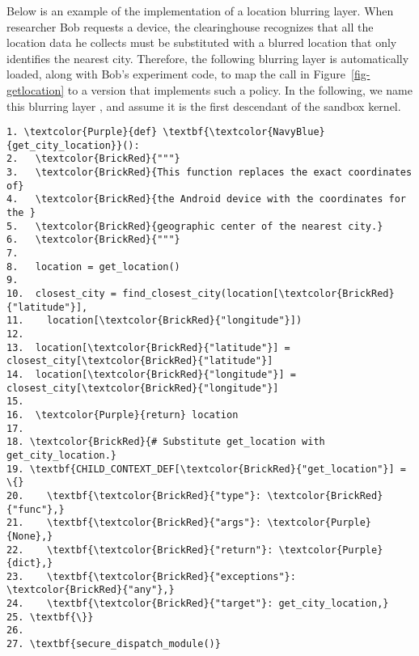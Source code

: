 
Below is an example of the implementation of a location blurring layer. 
When researcher Bob requests a device, the clearinghouse recognizes that all the location data
he collects must be substituted with a blurred location that only identifies the nearest city.
Therefore, the following blurring layer is
automatically loaded, along with Bob's experiment code, to map 
the  call in Figure~\ref{fig-getlocation} to a version 
that implements such a policy. In the following, we name this
blurring layer , and assume it is the first descendant
of the sandbox kernel.

\begin{Verbatim}
1. \textcolor{Purple}{def} \textbf{\textcolor{NavyBlue}{get_city_location}}():
2.   \textcolor{BrickRed}{"""}
3.   \textcolor{BrickRed}{This function replaces the exact coordinates of} 
4.   \textcolor{BrickRed}{the Android device with the coordinates for the } 
5.   \textcolor{BrickRed}{geographic center of the nearest city.}
6.   \textcolor{BrickRed}{"""}
7.
8.   location = get_location()
9.
10.  closest_city = find_closest_city(location[\textcolor{BrickRed}{"latitude"}],
11.    location[\textcolor{BrickRed}{"longitude"}])
12.
13.  location[\textcolor{BrickRed}{"latitude"}] = closest_city[\textcolor{BrickRed}{"latitude"}]
14.  location[\textcolor{BrickRed}{"longitude"}] = closest_city[\textcolor{BrickRed}{"longitude"}]
15.
16.  \textcolor{Purple}{return} location
17.
18. \textcolor{BrickRed}{# Substitute get_location with get_city_location.}
19. \textbf{CHILD_CONTEXT_DEF[\textcolor{BrickRed}{"get_location"}] = \{}
20.    \textbf{\textcolor{BrickRed}{"type"}: \textcolor{BrickRed}{"func"},}
21.    \textbf{\textcolor{BrickRed}{"args"}: \textcolor{Purple}{None},}
22.    \textbf{\textcolor{BrickRed}{"return"}: \textcolor{Purple}{dict},}
23.    \textbf{\textcolor{BrickRed}{"exceptions"}: \textcolor{BrickRed}{"any"},}
24.    \textbf{\textcolor{BrickRed}{"target"}: get_city_location,}
25. \textbf{\}}
26.
27. \textbf{secure_dispatch_module()}
\end{Verbatim}


